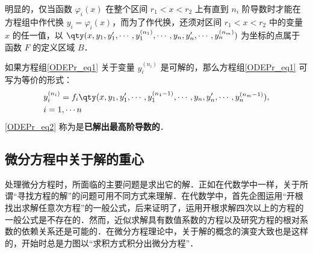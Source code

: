 明显的，仅当函数 $\varphi_i(x)$ 在整个区间 $r_1<x<r_2$ 上有直到 $n_i$ 阶导数时才能在方程组中作代换 $y_i=\varphi_i(x)$，而为了作代换，还须对区间 $r_1<x<r_2$ 中的变量 $x$ 的任一值，以 $\qty(x,y_1,y_1',\cdots,y_1^{(n_1)},\cdots,y_n,y_n',\cdots,y_n^{(n_m)})$ 为坐标的点属于函数 $F$ 的定义区域 $B$．

如果方程组\autoref{ODEPr_eq1} 关于变量 $y_i^{(n_i)}$ 是可解的，那么方程组\autoref{ODEPr_eq1} 可写为等价的形式： 
\begin{equation}\label{ODEPr_eq2}
\begin{aligned}
&y_i^{(n_i)}=f_i\qty(x,y_1,y_1',\cdots,y_1^{(n_1-1)},\cdots,y_n,y_n',\cdots,y_n^{(n_m-1)}),\\
& i=1,\cdots n
\end{aligned}
\end{equation}
\autoref{ODEPr_eq2} 称为是\textbf{已解出最高阶导数的}．
\subsection{微分方程中关于解的重心}
处理微分方程时，所面临的主要问题是求出它的解．正如在代数学中一样，关于所谓“寻找方程的解”的问题可用不同方式来理解．在代数学中，首先企图运用“开根找出求解任意次方程”的一般公式，后来证明了，运用开根求解四次以上的方程的一般公式是不存在的．然而，近似求解具有数值系数的方程以及研究方程的根对系数的依赖关系还是可能的．在微分方程理论中，关于解的概念的演变大致也是这样的，开始时总是力图以“求积方式积分出微分方程”．